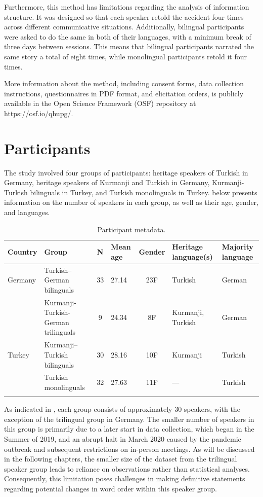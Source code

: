 Furthermore, this method has limitations regarding the analysis of information structure. It was designed so that each speaker retold the accident four times across different communicative situations. Additionally, bilingual participants were asked to do the same in both of their languages, with a minimum break of three days between sessions. This means that bilingual participants narrated the same story a total of eight times, while monolingual participants retold it four times.

More information about the method, including consent forms, data collection instructions, questionnaires in PDF format, and elicitation orders, is publicly available in the Open Science Framework (OSF) repository at https://osf.io/qhupg/.

\section{Participants}\label{sec:key:4.2}

The study involved four groups of participants: heritage speakers of Turkish in Germany, heritage speakers of Kurmanji and Turkish in Germany, Kurmanji-Turkish bilinguals in Turkey, and Turkish monolinguals in Turkey.  below presents information on the number of speakers in each group, as well as their age, gender, and languages.

\begin{table}\small
\begin{tabularx}{\textwidth}{l X c l c X X}
\lsptoprule
Country & Group & N & Mean age & Gender & Heritage language(s) & Majority language\\
\midrule
{Germany}
 & Turkish--German bilinguals & 33 & 27.14 & 23F & Turkish & German\\
\midrule
& Kurmanji-Turkish-German trilinguals & 9 & 24.34 & 8F & Kurmanji, Turkish & German\\
\midrule
{Turkey}
 & Kurmanji--Turkish bilinguals & 30 & 28.16 & 10F & Kurmanji & Turkish\\
\midrule
 & Turkish monolinguals & 32 & 27.63 & 11F & — & Turkish\\
\lspbottomrule
\end{tabularx}
\caption{\label{tab:key:4.1}Participant metadata.}
\end{table}

As indicated in , each group consists of approximately 30 speakers, with the exception of the trilingual group in Germany. The smaller number of speakers in this group is primarily due to a later start in data collection, which began in the Summer of 2019, and an abrupt halt in March 2020 caused by the pandemic outbreak and subsequent restrictions on in-person meetings. As will be discussed in the following chapters, the smaller size of the dataset from the trilingual speaker group leads to reliance on observations rather than statistical analyses. Consequently, this limitation poses challenges in making definitive statements regarding potential changes in word order within this speaker group.


